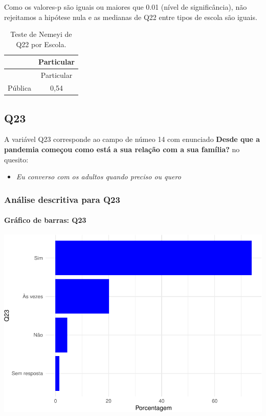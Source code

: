 \documentclass[]{article}
\providecommand{\tightlist}{%
  \setlength{\itemsep}{0pt}\setlength{\parskip}{0pt}}
\let\oldparagraph\paragraph
\renewcommand{\paragraph}[1]{\oldparagraph{#1}\mbox{}}
\begin{document}
Como os valores-p são iguais ou maiores que 0.01 (nível de significância), não rejeitamos a hipótese nula e as medianas de Q22 entre tipos de escola são iguais.

\begin{longtable}[]{@{}lc@{}}
\caption{\label{tab:unnamed-chunk-533}Teste de Nemeyi de Q22 por Escola.}\tabularnewline
\toprule
& Particular\tabularnewline
\midrule
\endfirsthead
\toprule
& Particular\tabularnewline
\midrule
\endhead
Pública & 0,54\tabularnewline
\bottomrule
\end{longtable}

\cleardoublepage

\hypertarget{q23}{%
\subsection{Q23}\label{q23}}

A variável Q23 corresponde ao campo de númeo 14 com enunciado \textbf{Desde que a pandemia começou como está a sua relação com a sua família?} no quesito:

\begin{itemize}
\tightlist
\item
  \emph{Eu converso com os adultos quando preciso ou quero}
\end{itemize}

\hypertarget{anuxe1lise-descritiva-para-q23}{%
\subsubsection{Análise descritiva para Q23}\label{anuxe1lise-descritiva-para-q23}}

\hypertarget{gruxe1fico-de-barras-q23}{%
\paragraph{Gráfico de barras: Q23}\label{gruxe1fico-de-barras-q23}}

\begin{center}\includegraphics[width=0.75\linewidth]{relatorio_covid19_files/figure-latex/unnamed-chunk-540-1} \end{center}
\end{document}
